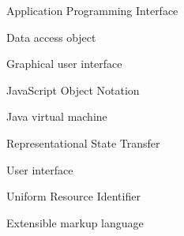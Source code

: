 \item[API] Application Programming Interface
\item[DAO] Data access object
\item[GUI] Graphical user interface
\item[JSON] JavaScript Object Notation
\item[JVM] Java virtual machine
\item[REST] Representational State Transfer
\item[UI] User interface
\item[URI] Uniform Resource Identifier
\item[XML] Extensible markup language